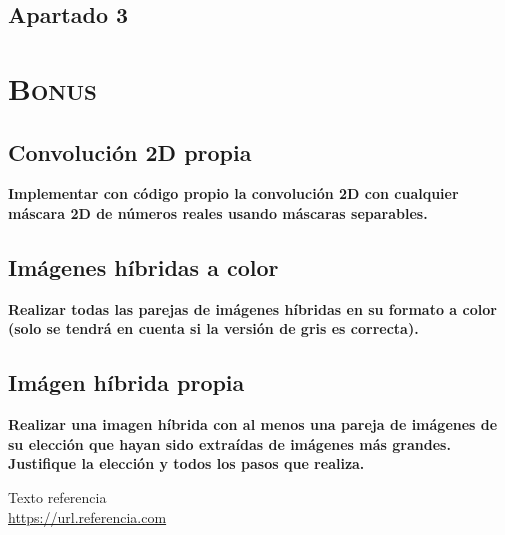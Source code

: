 \documentclass[11pt,a4paper]{article}
\begin{document}
\subsection{Apartado 3}

\newpage

\section{\textsc{Bonus}}

\subsection{Convolución 2D propia}

\noindent \textbf{Implementar con código propio la convolución 2D con cualquier máscara 2D de números reales usando
máscaras separables.}

\subsection{Imágenes híbridas a color}

\noindent \textbf{Realizar todas las parejas de imágenes híbridas en su formato a color (solo se tendrá en cuenta
si la versión de gris es correcta).}

\subsection{Imágen híbrida propia}

\noindent \textbf{Realizar una imagen híbrida con al menos una pareja de imágenes de su elección que hayan
sido extraídas de imágenes más grandes. Justifique la elección y todos los pasos que realiza.}

\newpage

\begin{thebibliography}{5}

Texto referencia
\\\url{https://url.referencia.com}

\end{thebibliography}
\end{document}
